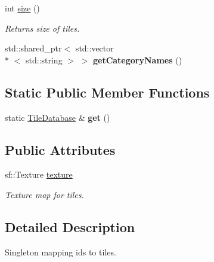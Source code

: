\begin{DoxyCompactItemize}
\item 
\hypertarget{classTileDatabase_aa5a42ef45241805cc6ebaf33621d6d31}{int \hyperlink{classTileDatabase_aa5a42ef45241805cc6ebaf33621d6d31}{size} ()}\label{classTileDatabase_aa5a42ef45241805cc6ebaf33621d6d31}

\begin{DoxyCompactList}\small\item\em Returns size of tiles. \end{DoxyCompactList}\item 
\hypertarget{classTileDatabase_ae3a143a8bdf964e1d3481d1d94a1fb37}{std\-::shared\-\_\-ptr$<$ std\-::vector\\*
$<$ std\-::string $>$ $>$ {\bfseries get\-Category\-Names} ()}\label{classTileDatabase_ae3a143a8bdf964e1d3481d1d94a1fb37}

\end{DoxyCompactItemize}
\subsection*{Static Public Member Functions}
\begin{DoxyCompactItemize}
\item 
\hypertarget{classTileDatabase_a305f67578059fc81b04b0c99f3065e8d}{static \hyperlink{classTileDatabase}{Tile\-Database} \& {\bfseries get} ()}\label{classTileDatabase_a305f67578059fc81b04b0c99f3065e8d}

\end{DoxyCompactItemize}
\subsection*{Public Attributes}
\begin{DoxyCompactItemize}
\item 
\hypertarget{classTileDatabase_a3368141d1a148afb5830ff86b3ca29f6}{sf\-::\-Texture \hyperlink{classTileDatabase_a3368141d1a148afb5830ff86b3ca29f6}{texture}}\label{classTileDatabase_a3368141d1a148afb5830ff86b3ca29f6}

\begin{DoxyCompactList}\small\item\em Texture map for tiles. \end{DoxyCompactList}\end{DoxyCompactItemize}


\subsection{Detailed Description}
Singleton mapping ids to tiles. 

